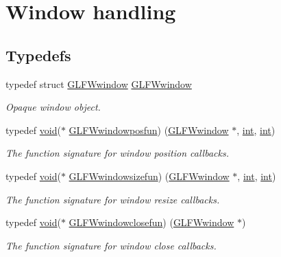 \hypertarget{group__window}{}\section{Window handling}
\label{group__window}
\subsection*{Typedefs}
\begin{DoxyCompactItemize}
\item 
typedef struct \hyperlink{group__window_ga3c96d80d363e67d13a41b5d1821f3242}{G\+L\+F\+Wwindow} \hyperlink{group__window_ga3c96d80d363e67d13a41b5d1821f3242}{G\+L\+F\+Wwindow}
\begin{DoxyCompactList}\small\item\em Opaque window object. \end{DoxyCompactList}\item 
typedef \hyperlink{wglew_8h_aeea6e3dfae3acf232096f57d2d57f084}{void}($\ast$ \hyperlink{group__window_gafd8db81fdb0e850549dc6bace5ed697a}{G\+L\+F\+Wwindowposfun}) (\hyperlink{group__window_ga3c96d80d363e67d13a41b5d1821f3242}{G\+L\+F\+Wwindow} $\ast$, \hyperlink{wglew_8h_a500a82aecba06f4550f6849b8099ca21}{int}, \hyperlink{wglew_8h_a500a82aecba06f4550f6849b8099ca21}{int})
\begin{DoxyCompactList}\small\item\em The function signature for window position callbacks. \end{DoxyCompactList}\item 
typedef \hyperlink{wglew_8h_aeea6e3dfae3acf232096f57d2d57f084}{void}($\ast$ \hyperlink{group__window_gae49ee6ebc03fa2da024b89943a331355}{G\+L\+F\+Wwindowsizefun}) (\hyperlink{group__window_ga3c96d80d363e67d13a41b5d1821f3242}{G\+L\+F\+Wwindow} $\ast$, \hyperlink{wglew_8h_a500a82aecba06f4550f6849b8099ca21}{int}, \hyperlink{wglew_8h_a500a82aecba06f4550f6849b8099ca21}{int})
\begin{DoxyCompactList}\small\item\em The function signature for window resize callbacks. \end{DoxyCompactList}\item 
typedef \hyperlink{wglew_8h_aeea6e3dfae3acf232096f57d2d57f084}{void}($\ast$ \hyperlink{group__window_ga93e7c2555bd837f4ed8b20f76cada72e}{G\+L\+F\+Wwindowclosefun}) (\hyperlink{group__window_ga3c96d80d363e67d13a41b5d1821f3242}{G\+L\+F\+Wwindow} $\ast$)
\begin{DoxyCompactList}\small\item\em The function signature for window close callbacks. \end{DoxyCompactList}\item 

\end{DoxyCompactItemize}
